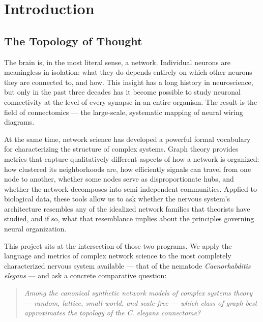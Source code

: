 \documentclass[12pt,a4paper]{report}
\begin{document}
\tableofcontents
\listoffigures
\listoftables
\clearpage
\hypersetup{pageanchor=true}

\chapter{Introduction}

\section{The Topology of Thought}

The brain is, in the most literal sense, a network. Individual neurons are meaningless in isolation: what they do depends entirely on which other neurons they are connected to, and how. This insight has a long history in neuroscience, but only in the past three decades has it become possible to study neuronal connectivity at the level of every synapse in an entire organism. The result is the field of connectomics — the large-scale, systematic mapping of neural wiring diagrams.

At the same time, network science has developed a powerful formal vocabulary for characterizing the structure of complex systems. Graph theory provides metrics that capture qualitatively different aspects of how a network is organized: how clustered its neighborhoods are, how efficiently signals can travel from one node to another, whether some nodes serve as disproportionate hubs, and whether the network decomposes into semi-independent communities. Applied to biological data, these tools allow us to ask whether the nervous system's architecture resembles any of the idealized network families that theorists have studied, and if so, what that resemblance implies about the principles governing neural organization.

This project sits at the intersection of those two programs. We apply the language and metrics of complex network science to the most completely characterized nervous system available — that of the nematode \textit{Caenorhabditis elegans} — and ask a concrete comparative question:

\begin{quote}
\textit{Among the canonical synthetic network models of complex systems theory — random, lattice, small-world, and scale-free — which class of graph best approximates the topology of the \textit{C. elegans} connectome?}
\end{quote}
\end{document}

